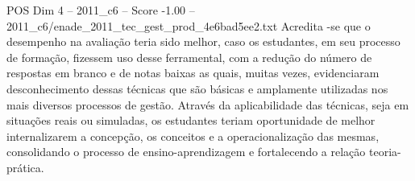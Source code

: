 \begin{textsample}{POS Dim 4 – 2011\_c6 – Score -1.00 – 2011\_c6/enade\_2011\_tec\_gest\_prod\_4e6bad5ee2.txt}
Acredita -se que o desempenho na avaliação teria sido melhor, caso os estudantes, em seu processo de formação, fizessem uso desse ferramental, com a redução do número de respostas em branco e de notas baixas as quais, muitas vezes, evidenciaram desconhecimento dessas técnicas que são básicas e amplamente utilizadas nos mais diversos processos de gestão.
Através da aplicabilidade das técnicas, seja em situações reais ou simuladas, os estudantes teriam oportunidade de melhor internalizarem a concepção, os conceitos e a operacionalização das mesmas, consolidando o processo de ensino-aprendizagem e fortalecendo a relação teoria-prática.

\end{textsample}
